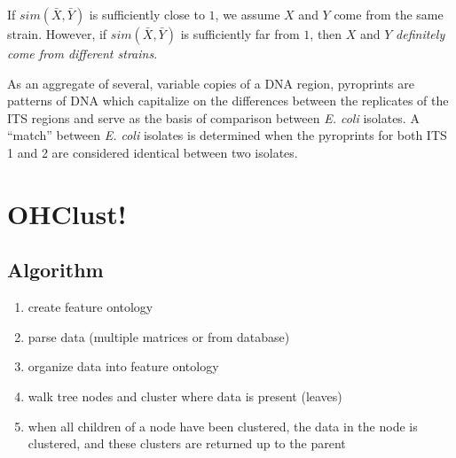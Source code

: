 \documentclass[12pt]{ucthesis}
\begin{document}
      If $sim(\bar{X}, \bar{Y})$ is
      sufficiently close to $1$, we assume $X$ and $Y$ come from the same strain.
      However, if $sim(\bar{X}, \bar{Y})$ is sufficiently far from $1$, then $X$ and
      $Y$ \textit{definitely come from different strains}.

      As an aggregate of several, variable copies of a DNA region, pyroprints
      are patterns of DNA which capitalize on the differences between the
      replicates of the ITS regions and serve as the basis of comparison
      between \textit{E. coli} isolates. A ``match'' between \textit{E. coli}
      isolates is determined when the pyroprints for both ITS 1 and 2 are
      considered identical between two isolates.

   \section{OHClust!}\label{sec:ohclust}
      \subsection{Algorithm}
         \begin{enumerate}
            \item create feature ontology
            \item parse data (multiple matrices or from database)
            \item organize data into feature ontology
            \item walk tree nodes and cluster where data is present (leaves)
            \item when all children of a node have been clustered, the data in the
                  node is clustered, and these clusters are returned up to the
                  parent
         \end{enumerate}
\end{document}
